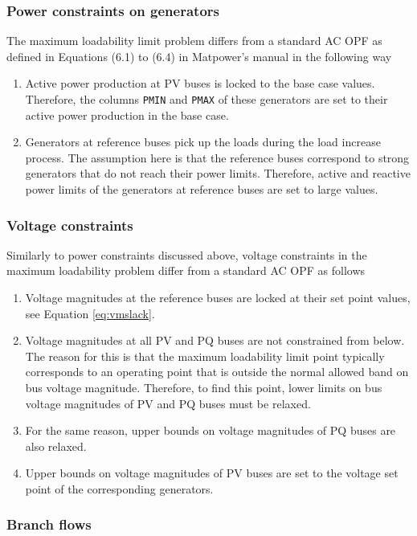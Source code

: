 \documentclass[12pt,a4]{article}
\newcommand*{\codemat}[1]{\texttt{#1}}
\newcommand*{\matpower}{{\sc Matpower}}
\begin{document}
\subsubsection{Power constraints on generators}
\label{sec:constr-gen}


The maximum loadability limit problem differs from a standard AC OPF as defined in Equations (6.1) to (6.4) in \matpower's manual in the following way
\begin{enumerate}
\item Active power production at PV buses is locked to the base case values. Therefore, the columns \codemat{PMIN} and \codemat{PMAX} of these generators are set to their active power production in the base case.
\item Generators at reference buses pick up the loads during the load increase process. The assumption here is that the reference buses correspond to strong generators that do not reach their power limits. Therefore, active and reactive power limits of the generators at reference buses are set to large values.
\end{enumerate}

\subsubsection{Voltage constraints}
\label{sec:volt-constr-at}
Similarly to power constraints discussed above, voltage constraints in the maximum loadability problem differ from a standard AC OPF as follows
\begin{enumerate}
\item Voltage magnitudes at the reference buses are locked at their set point values, see Equation \eqref{eq:vmslack}.
\item Voltage magnitudes at all PV and PQ buses are not constrained from below. The reason for this is that the maximum loadability limit point typically corresponds to an operating point that is outside the normal allowed band on bus voltage magnitude. Therefore, to find this point, lower limits on bus voltage magnitudes of PV and PQ buses must be relaxed.
\item For the same reason, upper bounds on voltage magnitudes of PQ buses are also relaxed.
\item Upper bounds on voltage magnitudes of PV buses are set to the voltage set point of the corresponding generators.
\end{enumerate}

\subsubsection{Branch flows}
\label{sec:branch-flows}
\end{document}
